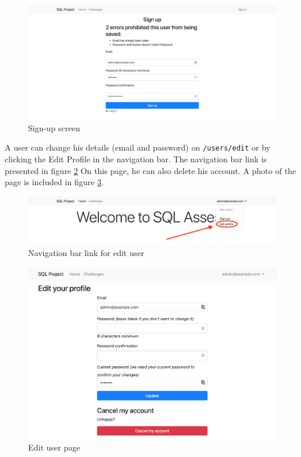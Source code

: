 \begin{figure}[ht]
    \centering
    \includegraphics[width=\textwidth/4*3]{Appendices/signup.png}
    \caption{Sign-up screen}
    \label{fig:app:newuser}
\end{figure}

A user can change his details (email and password) on \texttt{/users/edit} or by clicking the Edit Profile in the navigation bar. The navigation bar link is presented in figure \ref{fig:app:editusernavbar} On this page, he can also delete his account. A photo of the page is included in figure \ref{fig:app:edituser}.

\begin{figure}[ht]
    \centering
    \includegraphics[width=\textwidth/4*3]{Appendices/editlinknavbar.png}
    \caption{Navigation bar link for edit user}
    \label{fig:app:editusernavbar}
\end{figure}

\begin{figure}[ht]
    \centering
    \includegraphics[width=\textwidth/4*3]{Appendices/edituser.png}
    \caption{Edit user page}
    \label{fig:app:edituser}
\end{figure}

